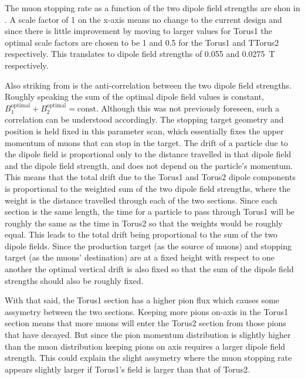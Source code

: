 \FigOptimMuBeamDipoleMuStops
\FigOptimMuBeamDipolePiStops

The muon stopping rate as a function of the two dipole field strengths are shon in .
A scale factor of 1 on the x-axis means no change to the current \phaseI design and since there is little improvement by moving to larger values for Torus1 the optimal scale factors are chosen to be 1 and 0.5 for the Torus1 and TTorus2 respectively.  
This translates to dipole field strengths of 0.055 and 0.0275~T respectively.

Also striking from  is the anti-correlation between the two dipole field strengths.  
Roughly speaking the sum of the optimal dipole field values is constant, \ie $B_1^\text{optimal} + B_2^\text{optimal} = \text{const}$.
Although this was not previously foreseen, such a correlation can be understood accordingly.
The stopping target geometry and position is held fixed in this parameter scan, which essentially fixes the upper momentum of muons that can stop in the target.
The drift of a particle due to the dipole field is proportional only to the distance travelled in that dipole field and the dipole field strength, and does not depend on the particle's momentum.
This means that the total drift due to the Torus1 and Torus2 dipole components is proportional to the weighted sum of the two dipole field strengths, where the weight is the distance travelled through each of the two sections.
Since each section is the same length, the time for a particle to pass through Torus1 will be roughly the same as the time in Torus2 so that the weights would be roughly equal.
This leads to the total drift being proportional to the sum of the two dipole fields.
Since the production target (as the source of muons) and stopping target (as the muons' destination) are at a fixed height with respect to one another the optimal vertical drift is also fixed so that the sum of the dipole field strengths should also be roughly fixed.

With that said, the Torus1 section has a higher pion flux which causes some assymetry between the two sections.
Keeping more pions on-axis in the Torus1 section means that more muons will enter the Torus2 section from those pions that have decayed.
But since the pion momentum distribution is slightly higher than the muon distribution keeping pions on axis requires a larger dipole field strength.
This could explain the slight assymetry where the muon stopping rate appears slightly larger if Torus1's field is larger than that of Torus2.

